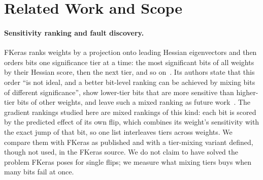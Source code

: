 \section{Related Work and Scope}\label{sec:related}
\paragraph{Sensitivity ranking and fault discovery.} FKeras ranks weights by a projection onto leading Hessian eigenvectors and then orders bits one significance tier at a time: the most significant bits of all weights by their Hessian score, then the next tier, and so on~\cite{weng2024fkeras}. Its authors state that this order ``is not ideal, and a better bit-level ranking can be achieved by mixing bits of different significance'', show lower-tier bits that are more sensitive than higher-tier bits of other weights, and leave such a mixed ranking as future work~\cite[Sec.~4.2.2]{weng2024fkeras}. The gradient rankings studied here are mixed rankings of this kind: each bit is scored by the predicted effect of its own flip, which combines its weight's sensitivity with the exact jump of that bit, so one list interleaves tiers across weights. We compare them with FKeras as published and with a tier-mixing variant defined, though not used, in the FKeras source. We do not claim to have solved the problem FKeras poses for single flips; we measure what mixing tiers buys when many bits fail at once.

